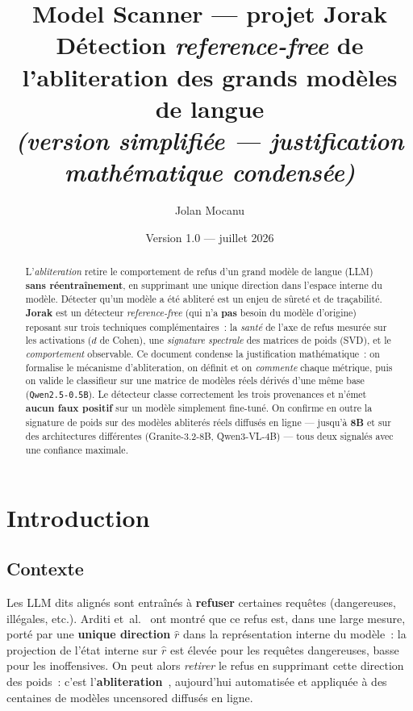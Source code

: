 \documentclass[11pt,a4paper]{article}
\title{\textbf{Model Scanner} — projet \textbf{Jorak} \\[2mm]
\large Détection \emph{reference-free} de l'abliteration des grands modèles de langue\\
\normalsize\emph{(version simplifiée — justification mathématique condensée)}}
\author{Jolan Mocanu}
\date{Version 1.0 --- juillet 2026}
\theoremstyle{definition}
\theoremstyle{plain}
\newcommand{\rhat}{\hat{r}}
\begin{document}
\maketitle

\begin{abstract}
\noindent
L'\emph{abliteration} retire le comportement de refus d'un grand modèle de langue
(LLM) \textbf{sans réentraînement}, en supprimant une unique direction dans
l'espace interne du modèle. Détecter qu'un modèle a été abliteré est un enjeu de
sûreté et de traçabilité. \textbf{Jorak} est un détecteur \emph{reference-free}
(qui n'a \textbf{pas} besoin du modèle d'origine) reposant sur trois techniques
complémentaires~: la \emph{santé} de l'axe de refus mesurée sur les activations
($d$ de Cohen), une \emph{signature spectrale} des matrices de poids (SVD), et le
\emph{comportement} observable. Ce document condense la justification
mathématique~: on formalise le mécanisme d'abliteration, on définit et on
\emph{commente} chaque métrique, puis on valide le classifieur sur une matrice de
modèles réels dérivés d'une même base (\texttt{Qwen2.5-0.5B}). Le détecteur classe
correctement les trois provenances et n'émet \textbf{aucun faux positif} sur un
modèle simplement fine-tuné. On confirme en outre la signature de poids sur des
modèles abliterés réels diffusés en ligne --- jusqu'à \textbf{8B} et sur des
architectures différentes (Granite-3.2-8B, Qwen3-VL-4B) --- tous deux signalés avec
une confiance maximale.
\end{abstract}

\tableofcontents
\bigskip

\section{Introduction}

\subsection{Contexte}
Les LLM dits \og alignés\fg{} sont entraînés à \textbf{refuser} certaines requêtes
(dangereuses, illégales, etc.). Arditi et~al.~\cite{arditi2024} ont montré que ce
refus est, dans une large mesure, porté par une \textbf{unique direction} $\rhat$
dans la représentation interne du modèle~: la projection de l'état interne sur
$\rhat$ est élevée pour les requêtes dangereuses, basse pour les inoffensives. On
peut alors \emph{retirer} le refus en supprimant cette direction des poids~: c'est
l'\textbf{abliteration}~\cite{labonne2024}, aujourd'hui automatisée et appliquée à
des centaines de modèles \og uncensored\fg{} diffusés en ligne.
\end{document}
